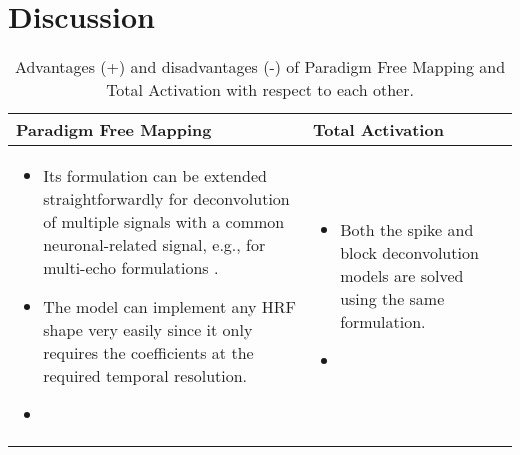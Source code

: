 \section{Discussion}

\newcommand\pro{\item[$+$]}
\newcommand\con{\item[$-$]}


\begin{table}
    \centering
    \begin{tabular}{ m{4cm} m{4cm} }
        Paradigm Free Mapping & Total Activation \\
        \toprule
        \begin{itemize}
            \pro Its formulation can be extended straightforwardly for deconvolution of multiple signals with a common neuronal-related signal, e.g., for multi-echo formulations \cite{caballero-gaudes2019DeconvolutionAlgorithmMultiecho}.
            \pro The model can implement any HRF shape very easily since it only requires the coefficients at the required temporal resolution.
            \con 
        \end{itemize} &
        \begin{itemize}
            \pro Both the spike and block deconvolution models are solved using the same formulation.
            \con 
        \end{itemize} \\
    \end{tabular}
    \caption{Advantages (+) and disadvantages (-) of Paradigm Free Mapping and Total Activation with respect to each other.}
    \label{tab:proscons}
\end{table}

